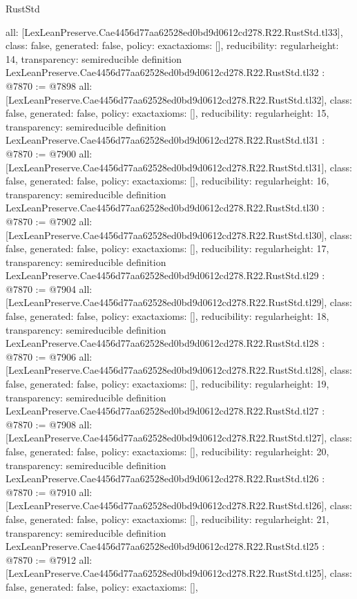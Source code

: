 \begin{lexlean}{RustStd}
\begin{coremodule}
{  all: [LexLeanPreserve.Cae4456d77aa62528ed0bd9d0612cd278.R22.RustStd.tl33],
  class: false,
  generated: false,
  policy: exact{axioms: []},
  reducibility: regular{height: 14},
  transparency: semireducible
}
definition LexLeanPreserve.Cae4456d77aa62528ed0bd9d0612cd278.R22.RustStd.tl32 : @7870 := @7898 {
  all: [LexLeanPreserve.Cae4456d77aa62528ed0bd9d0612cd278.R22.RustStd.tl32],
  class: false,
  generated: false,
  policy: exact{axioms: []},
  reducibility: regular{height: 15},
  transparency: semireducible
}
definition LexLeanPreserve.Cae4456d77aa62528ed0bd9d0612cd278.R22.RustStd.tl31 : @7870 := @7900 {
  all: [LexLeanPreserve.Cae4456d77aa62528ed0bd9d0612cd278.R22.RustStd.tl31],
  class: false,
  generated: false,
  policy: exact{axioms: []},
  reducibility: regular{height: 16},
  transparency: semireducible
}
definition LexLeanPreserve.Cae4456d77aa62528ed0bd9d0612cd278.R22.RustStd.tl30 : @7870 := @7902 {
  all: [LexLeanPreserve.Cae4456d77aa62528ed0bd9d0612cd278.R22.RustStd.tl30],
  class: false,
  generated: false,
  policy: exact{axioms: []},
  reducibility: regular{height: 17},
  transparency: semireducible
}
definition LexLeanPreserve.Cae4456d77aa62528ed0bd9d0612cd278.R22.RustStd.tl29 : @7870 := @7904 {
  all: [LexLeanPreserve.Cae4456d77aa62528ed0bd9d0612cd278.R22.RustStd.tl29],
  class: false,
  generated: false,
  policy: exact{axioms: []},
  reducibility: regular{height: 18},
  transparency: semireducible
}
definition LexLeanPreserve.Cae4456d77aa62528ed0bd9d0612cd278.R22.RustStd.tl28 : @7870 := @7906 {
  all: [LexLeanPreserve.Cae4456d77aa62528ed0bd9d0612cd278.R22.RustStd.tl28],
  class: false,
  generated: false,
  policy: exact{axioms: []},
  reducibility: regular{height: 19},
  transparency: semireducible
}
definition LexLeanPreserve.Cae4456d77aa62528ed0bd9d0612cd278.R22.RustStd.tl27 : @7870 := @7908 {
  all: [LexLeanPreserve.Cae4456d77aa62528ed0bd9d0612cd278.R22.RustStd.tl27],
  class: false,
  generated: false,
  policy: exact{axioms: []},
  reducibility: regular{height: 20},
  transparency: semireducible
}
definition LexLeanPreserve.Cae4456d77aa62528ed0bd9d0612cd278.R22.RustStd.tl26 : @7870 := @7910 {
  all: [LexLeanPreserve.Cae4456d77aa62528ed0bd9d0612cd278.R22.RustStd.tl26],
  class: false,
  generated: false,
  policy: exact{axioms: []},
  reducibility: regular{height: 21},
  transparency: semireducible
}
definition LexLeanPreserve.Cae4456d77aa62528ed0bd9d0612cd278.R22.RustStd.tl25 : @7870 := @7912 {
  all: [LexLeanPreserve.Cae4456d77aa62528ed0bd9d0612cd278.R22.RustStd.tl25],
  class: false,
  generated: false,
  policy: exact{axioms: []},
}
\end{coremodule}
\end{lexlean}
